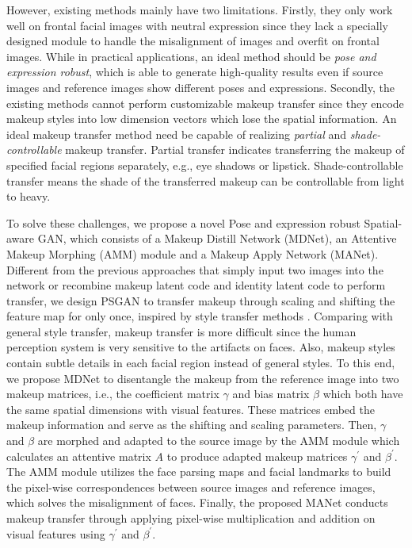  
However, existing methods mainly have two limitations. 
Firstly, they only work well on frontal facial images with neutral expression since they lack a specially designed module to handle the misalignment of images and overfit on frontal images. 
While in practical applications, an ideal method should be \emph{pose and expression robust}, which is able to generate high-quality results even if source images and reference images show different poses and expressions. 
Secondly, the existing methods cannot perform customizable makeup transfer since they encode makeup styles into low dimension vectors which lose the spatial information. An ideal makeup transfer method need be capable of realizing \emph{partial} and \emph{shade-controllable} makeup transfer. Partial transfer indicates transferring the makeup of specified facial regions separately, e.g., eye shadows or lipstick. Shade-controllable transfer means the shade of the transferred makeup can be controllable from light to heavy.

To solve these challenges, we propose a novel Pose and expression robust Spatial-aware GAN, which consists of a Makeup Distill Network (MDNet), an Attentive Makeup Morphing (AMM) module and a Makeup Apply Network (MANet).
Different from the previous approaches that simply input two images into the  network or recombine makeup latent code and identity latent code to perform transfer, we design PSGAN to transfer makeup through scaling and shifting the feature map for only once, inspired by style transfer methods \cite{Huang2017ArbitraryST,Dumoulin2016ALR}.
Comparing with general style transfer, makeup transfer is more difficult since the human perception system is very sensitive to the artifacts on faces. Also, makeup styles contain subtle details in each facial region instead of general styles. To this end, we propose MDNet to disentangle the makeup from the reference image into two makeup matrices, i.e., the coefficient matrix $\gamma$ and bias matrix $\beta$ which both have the same spatial dimensions with visual features. These matrices embed the makeup information and serve as the shifting and scaling parameters. Then, $\gamma$ and $\beta$ are morphed and adapted to the source image by the AMM module which calculates an attentive matrix $A$ to produce adapted makeup matrices $\gamma^{\prime}$ and $\beta^{\prime}$. 
The AMM module utilizes the face parsing maps and facial landmarks to build the pixel-wise correspondences between source images and reference images, which solves the misalignment of faces. 
Finally, the proposed MANet conducts makeup transfer through applying pixel-wise multiplication and addition on visual features using $\gamma^{\prime}$ and $\beta^{\prime}$.

